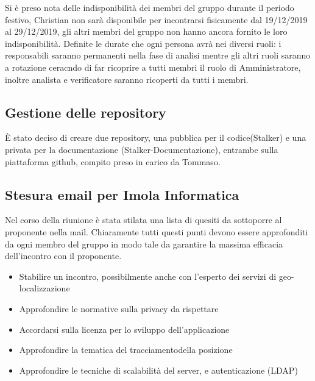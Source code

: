Si è preso nota delle indisponibilità dei membri del gruppo durante il periodo festivo, Christian non sarà disponibile per incontrarsi fisicamente dal 19/12/2019 al 29/12/2019, gli altri membri del gruppo non hanno ancora fornito le loro indisponibilità. 
Definite le durate che ogni persona avrà nei diversi ruoli: i responsabili saranno permanenti nella fase di analisi mentre gli altri ruoli saranno a rotazione ceracndo di far ricoprire a tutti membri il ruolo di Amministratore, inoltre analista e verificatore saranno ricoperti da tutti i membri.  \\

\subsection{Gestione delle repository}
È stato deciso di creare due repository, una pubblica per il codice(Stalker) e una privata per la documentazione (Stalker-Documentazione), entrambe sulla piattaforma github, compito preso in carico da Tommaso. \\

\subsection{Stesura email per Imola Informatica}
Nel corso della riunione è stata stilata una lista di quesiti da sottoporre al proponente nella mail. 
Chiaramente tutti questi punti devono essere approfonditi da ogni membro del gruppo in modo tale da garantire la massima efficacia dell'incontro con il proponente.
\begin{itemize}
\item Stabilire un incontro, possibilmente anche con l’esperto dei servizi di geo-localizzazione
\item Approfondire le normative sulla privacy da rispettare
\item Accordarsi sulla licenza per lo sviluppo dell'applicazione
\item Approfondire la tematica del tracciamentodella posizione
\item Approfondire le tecniche di scalabilità del server, e autenticazione (LDAP)
\end{itemize} 

